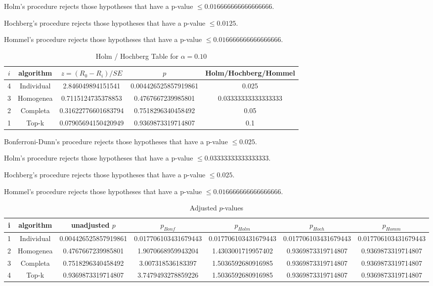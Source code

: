 \documentclass[a4paper,10pt]{article}
\begin{document}
\begin{landscape}
Holm's procedure rejects those hypotheses that have a p-value $\le0.016666666666666666$.


Hochberg's procedure rejects those hypotheses that have a p-value $\le0.0125$.


Hommel's procedure rejects those hypotheses that have a p-value $\le0.016666666666666666$.


\begin{table}[!htp]
\centering\tiny
\caption{Holm / Hochberg Table for $\alpha=0.10$}
\begin{tabular}{ccccc}
$i$&algorithm&$z=(R_0 - R_i)/SE$&$p$&Holm/Hochberg/Hommel\\
\hline
4&Individual&2.846049894151541&0.004426525857919861&0.025\\
3&Homogenea&0.7115124735378853&0.4767667239985801&0.03333333333333333\\
2&Completa&0.31622776601683794&0.7518296340458492&0.05\\
1&Top-k&0.07905694150420949&0.9369873319714807&0.1\\
\hline
\end{tabular}
\end{table}
Bonferroni-Dunn's procedure rejects those hypotheses that have a p-value $\le0.025$.


Holm's procedure rejects those hypotheses that have a p-value $\le0.03333333333333333$.


Hochberg's procedure rejects those hypotheses that have a p-value $\le0.025$.


Hommel's procedure rejects those hypotheses that have a p-value $\le0.016666666666666666$.


\begin{table}[!htp]
\centering\tiny
\caption{Adjusted $p$-values}
\begin{tabular}{ccccccc}
i&algorithm&unadjusted $p$&$p_{Bonf}$&$p_{Holm}$&$p_{Hoch}$&$p_{Homm}$\\
\hline
1&Individual&0.004426525857919861&0.017706103431679443&0.017706103431679443&0.017706103431679443&0.017706103431679443\\
2&Homogenea&0.4767667239985801&1.9070668959943204&1.4303001719957402&0.9369873319714807&0.9369873319714807\\
3&Completa&0.7518296340458492&3.007318536183397&1.5036592680916985&0.9369873319714807&0.9369873319714807\\
4&Top-k&0.9369873319714807&3.7479493278859226&1.5036592680916985&0.9369873319714807&0.9369873319714807\\
\hline
\end{tabular}
\end{table}


\end{landscape}
\end{document}

